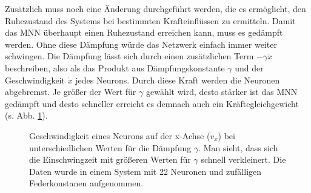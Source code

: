 \documentclass[10pt]{scrartcl}
\begin{document}
Zusätzlich muss noch eine Änderung durchgeführt werden, die es ermöglicht, den Ruhezustand des Systems bei bestimmten Krafteinflüssen zu ermitteln.
Damit das MNN überhaupt einen Ruhezustand erreichen kann, muss es gedämpft werden.
Ohne diese Dämpfung würde das Netzwerk einfach immer weiter schwingen. 
Die Dämpfung lässt sich durch einen zusätzlichen Term $-\gamma \dot{x}$ beschreiben, also als das Produkt aus 
Dämpfungskonstante $\gamma$ und der
Geschwindigkeit $\dot{x}$ jedes Neurons.
Durch diese Kraft werden die Neuronen abgebremst.
Je größer der Wert für $\gamma$ gewählt wird, desto stärker ist das MNN gedämpft und desto schneller erreicht es demnach auch ein Kräftegleichgewicht (s. Abb. \ref{fig:dämpfung}).

\begin{figure}[htb!]
    \centering
    \Data
    \caption{Geschwindigkeit eines Neurons auf der x-Achse ($v_x$) bei unterschiedlichen Werten für die Dämpfung $\gamma$. Man sieht, dass sich die Einschwingzeit mit größeren Werten für $\gamma$ schnell verkleinert. Die Daten wurde in einem System mit 22 Neuronen und zufälligen Federkonstanen aufgenommen.
    }
    \label{fig:dämpfung}
\end{figure}
\end{document}
